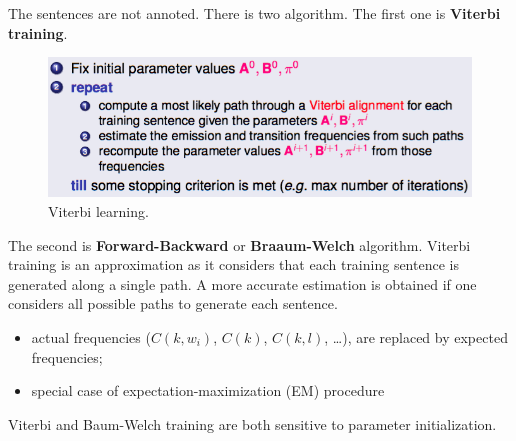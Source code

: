 The sentences are not annoted. There is two algorithm. The first one is \textbf{Viterbi training}.

\begin{figure}[htp]
	\centering
	\includegraphics[scale=0.6]{images/34_viterbi.png}
 	\caption{Viterbi learning.}
\end{figure}

The second is \textbf{Forward-Backward} or \textbf{Braaum-Welch} algorithm. Viterbi training is an approximation as it considers that each training sentence is generated along a single path. A more accurate estimation is obtained if one considers all possible paths to generate each sentence.

\begin{itemize}
	\item actual frequencies ($C(k, w_i)$, $C(k)$, $C(k, l)$, \dots ), are replaced by expected frequencies;
	\item   special case of expectation-maximization (EM) procedure
\end{itemize}

Viterbi and Baum-Welch training are both sensitive to parameter initialization.



